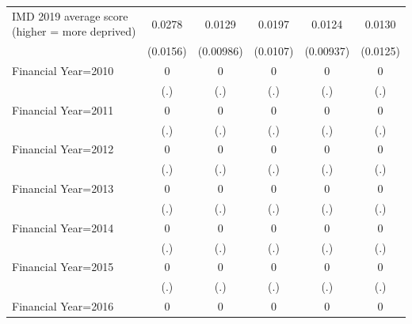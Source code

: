 \begin{table}[htbp]
\begin{tabular}{l*{5}{c}}
\addlinespace
IMD 2019 average score (higher = more deprived)&      0.0278\sym{*}  &      0.0129         &      0.0197\sym{*}  &      0.0124         &      0.0130         \\
                    &    (0.0156)         &   (0.00986)         &    (0.0107)         &   (0.00937)         &    (0.0125)         \\
\addlinespace
Financial Year=2010 &           0         &           0         &           0         &           0         &           0         \\
                    &         (.)         &         (.)         &         (.)         &         (.)         &         (.)         \\
\addlinespace
Financial Year=2011 &           0         &           0         &           0         &           0         &           0         \\
                    &         (.)         &         (.)         &         (.)         &         (.)         &         (.)         \\
\addlinespace
Financial Year=2012 &           0         &           0         &           0         &           0         &           0         \\
                    &         (.)         &         (.)         &         (.)         &         (.)         &         (.)         \\
\addlinespace
Financial Year=2013 &           0         &           0         &           0         &           0         &           0         \\
                    &         (.)         &         (.)         &         (.)         &         (.)         &         (.)         \\
\addlinespace
Financial Year=2014 &           0         &           0         &           0         &           0         &           0         \\
                    &         (.)         &         (.)         &         (.)         &         (.)         &         (.)         \\
\addlinespace
Financial Year=2015 &           0         &           0         &           0         &           0         &           0         \\
                    &         (.)         &         (.)         &         (.)         &         (.)         &         (.)         \\
\addlinespace
Financial Year=2016 &           0         &           0         &           0         &           0         &           0         \\

\end{tabular}
\end{table}
